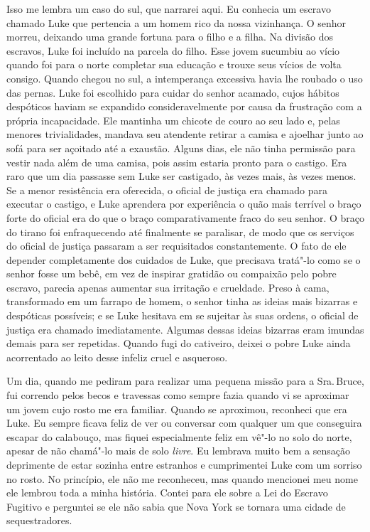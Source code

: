 Isso me lembra um caso do sul, que
narrarei aqui. Eu conhecia um escravo chamado Luke que pertencia a um
homem rico da nossa vizinhança. O senhor morreu, deixando uma grande
fortuna para o filho e a filha. Na divisão dos escravos, Luke foi
incluído na parcela do filho. Esse jovem sucumbiu ao vício quando foi
para o norte completar sua educação e trouxe seus vícios de volta
consigo. Quando chegou no sul, a intemperança excessiva havia lhe
roubado o uso das pernas. Luke foi escolhido para cuidar do senhor
acamado, cujos hábitos despóticos haviam se expandido consideravelmente
por causa da frustração com a própria incapacidade. Ele mantinha um
chicote de couro ao seu lado e, pelas menores trivialidades, mandava seu
atendente retirar a camisa e ajoelhar junto ao sofá para ser açoitado
até a exaustão. Alguns dias, ele não tinha permissão para vestir nada
além de uma camisa, pois assim estaria pronto para o castigo. Era raro
que um dia passasse sem Luke ser castigado, às vezes mais, às vezes
menos. Se a menor resistência era oferecida, o oficial de justiça era
chamado para executar o castigo, e Luke aprendera por experiência o quão
mais terrível o braço forte do oficial era do que o braço
comparativamente fraco do seu senhor. O braço do tirano foi
enfraquecendo até finalmente se paralisar, de modo que os serviços do
oficial de justiça passaram a ser requisitados constantemente. O fato de
ele depender completamente dos cuidados de Luke, que precisava tratá"-lo
como se o senhor fosse um bebê, em vez de inspirar gratidão ou compaixão
pelo pobre escravo, parecia apenas aumentar sua irritação e crueldade.
Preso à cama, transformado em um farrapo de homem, o senhor tinha as
ideias mais bizarras e despóticas possíveis; e se Luke hesitava em se
sujeitar às suas ordens, o oficial de justiça era chamado imediatamente.
Algumas dessas ideias bizarras eram imundas demais para ser repetidas.
Quando fugi do cativeiro, deixei o pobre Luke ainda acorrentado ao leito
desse infeliz cruel e asqueroso.

Um dia, quando me pediram para realizar
uma pequena missão para a Sra.\,Bruce, fui correndo pelos becos e
travessas como sempre fazia quando vi se aproximar um jovem cujo rosto
me era familiar. Quando se aproximou, reconheci que era Luke. Eu sempre
ficava feliz de ver ou conversar com qualquer um que conseguira escapar
do calabouço, mas fiquei especialmente feliz em vê"-lo no solo do norte,
apesar de não chamá"-lo mais de solo \emph{livre}. Eu lembrava muito bem
a sensação deprimente de estar sozinha entre estranhos e cumprimentei
Luke com um sorriso no rosto. No princípio, ele não me reconheceu, mas
quando mencionei meu nome ele lembrou toda a minha história. Contei para
ele sobre a Lei do Escravo Fugitivo e perguntei se ele não sabia que
Nova York se tornara uma cidade de sequestradores.

